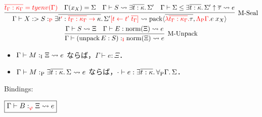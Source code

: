 \begin{gather*}
  \infer[\text{M-Seal}]{\Gamma \vdash X :> S:_{\textcolor{red}{\symP}} \exists \overline{t\textcolor{red}{'}: \textcolor{red}{\overline{t_\Gamma: \kappa_\Gamma} \to}\; \kappa}\ldotp \Sigma'\textcolor{red}{[t \assign t'\; \overline{t_\Gamma}]} \elaborate \sympack\langle \overline{\textcolor{red}{\lambda \overline{t_\Gamma: \kappa_\Gamma}\ldotp} \tau}, \textcolor{red}{\Lambda_\symP \Gamma\ldotp} e\; x_X\rangle}{
    \textcolor{red}{\overline{t_\Gamma: \kappa_\Gamma} = \typeenv(\Gamma)}
    &
    \Gamma(x_X) = \Sigma
    &
    \Gamma \vdash S \elaborate \exists \overline{t: \kappa}\ldotp \Sigma'
    &
    \Gamma \vdash \Sigma \leq \exists \overline{t: \kappa}\ldotp \Sigma' \uparrow \overline{\tau} \elaborate e
  }
  \\
  \infer[\text{M-Unpack}]{\Gamma \vdash (\symunpack E: S):_{\textcolor{red}{\symI}} \symnorm(\Xi) \elaborate e}{
    \Gamma \vdash S \elaborate \Xi
    &
    \Gamma \vdash E: \symnorm(\Xi) \elaborate e
  }
\end{gather*}

\begin{theorem}
  \hwordspace{}
  \begin{itemize}
    \item $\Gamma \vdash M:_{\mathrm{I}} \Xi \rightsquigarrow e$ ならば，$\Gamma \vdash e: \Xi$．
    \item $\Gamma \vdash M:_{\mathrm{P}} \exists \overline{t: \kappa}\ldotp \Sigma \rightsquigarrow e$ ならば，$\cdot \vdash e: \exists \overline{t: \kappa}\ldotp \forall_{\mathrm{P}} \Gamma\ldotp \Sigma$．
  \end{itemize}
\end{theorem}

Bindings:

$\fbox{$\Gamma \vdash B:_{\textcolor{red}{\varphi}} \Xi \rightsquigarrow e$}$

